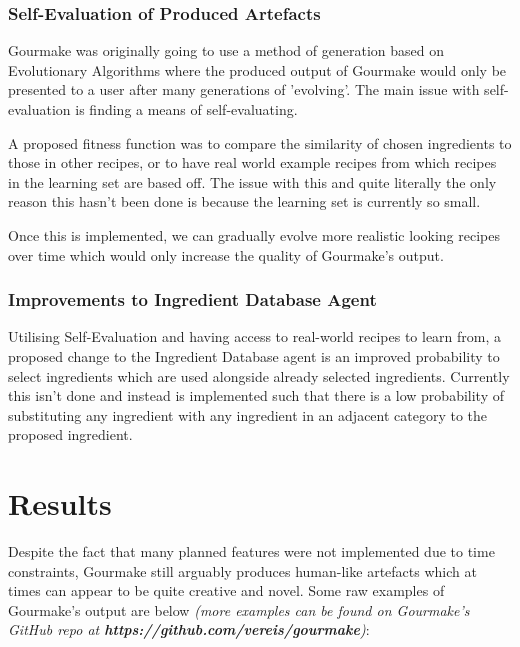\documentclass[9pt,titlepage,a4paper]{extarticle}
\begin{document}
\subsubsection{Self-Evaluation of Produced Artefacts}
    Gourmake was originally going to use a method of generation based on Evolutionary Algorithms where the produced output
    of Gourmake would only be presented to a user after many generations of 'evolving'. The main issue with self-evaluation
    is finding a means of self-evaluating.

    A proposed fitness function was to compare the similarity of chosen ingredients to those in other recipes, or to have
    real world example recipes from which recipes in the learning set are based off. The issue with this and quite literally
    the only reason this hasn't been done is because the learning set is currently so small.

    Once this is implemented, we can gradually evolve more realistic looking recipes over time which would only increase
    the quality of Gourmake's output.

\subsubsection{Improvements to Ingredient Database Agent}
    Utilising Self-Evaluation and having access to real-world recipes to learn from, a proposed change to the Ingredient Database
    agent is an improved probability to select ingredients which are used alongside already selected ingredients. Currently
    this isn't done and instead is implemented such that there is a low probability of substituting any ingredient with
    any ingredient in an adjacent category to the proposed ingredient.

\section{Results}
    Despite the fact that many planned features were not implemented due to time constraints, Gourmake still arguably produces
    human-like artefacts which at times can appear to be quite creative and novel. Some raw examples of Gourmake's output are
    below \textit{(more examples can be found on Gourmake's GitHub repo at \textbf{https://github.com/vereis/gourmake})}:
\end{document}
